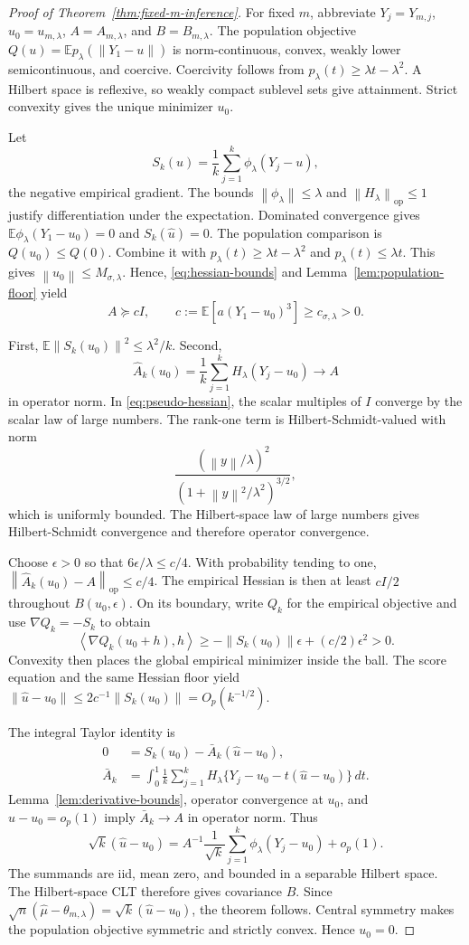 \documentclass[twoside]{article}
\theoremstyle{definition}
\newcommand{\E}{\mathbb E}
\newcommand{\norm}[1]{\left\lVert #1\right\rVert}
\newcommand{\ip}[2]{\left\langle #1,#2\right\rangle}
\newcommand{\op}{\mathrm{op}}
\begin{document}
\begin{proof}[Proof of Theorem~\ref{thm:fixed-m-inference}]
For fixed $m$, abbreviate $Y_j=Y_{m,j}$, $u_0=u_{m,\lambda}$, $A=A_{m,\lambda}$, and $B=B_{m,\lambda}$. The population objective $Q(u)=\E p_\lambda(\norm{Y_1-u})$ is norm-continuous, convex, weakly lower semicontinuous, and coercive. Coercivity follows from $p_\lambda(t)\ge\lambda t-\lambda^2$. A Hilbert space is reflexive, so weakly compact sublevel sets give attainment. Strict convexity gives the unique minimizer $u_0$.

Let
\[
    S_k(u)=\frac1k\sum_{j=1}^k\phi_\lambda(Y_j-u),
\]
the negative empirical gradient. The bounds $\norm{\phi_\lambda}\le\lambda$ and $\norm{H_\lambda}_{\op}\le1$ justify differentiation under the expectation. Dominated convergence gives $\E\phi_\lambda(Y_1-u_0)=0$ and $S_k(\hat u)=0$. The population comparison is $Q(u_0)\le Q(0)$. Combine it with $p_\lambda(t)\ge\lambda t-\lambda^2$ and $p_\lambda(t)\le\lambda t$. This gives $\norm{u_0}\le M_{\sigma,\lambda}$. Hence, \eqref{eq:hessian-bounds} and Lemma~\ref{lem:population-floor} yield
\[
    A\succeq cI,
    \qquad
    c:=\E[a(Y_1-u_0)^3]\ge c_{\sigma,\lambda}>0.
\]

First, $\E\norm{S_k(u_0)}^2\le\lambda^2/k$. Second,
\[
    \hat A_k(u_0)=\frac1k\sum_{j=1}^kH_\lambda(Y_j-u_0)\longrightarrow A
\]
in operator norm. In \eqref{eq:pseudo-hessian}, the scalar multiples of $I$ converge by the scalar law of large numbers. The rank-one term is Hilbert-Schmidt-valued with norm
\[
    \frac{(\norm y/\lambda)^2}{(1+\norm y^2/\lambda^2)^{3/2}},
\]
which is uniformly bounded. The Hilbert-space law of large numbers gives Hilbert-Schmidt convergence and therefore operator convergence.

Choose $\epsilon>0$ so that $6\epsilon/\lambda\le c/4$. With probability tending to one, $\norm{\hat A_k(u_0)-A}_{\op}\le c/4$. The empirical Hessian is then at least $cI/2$ throughout $B(u_0,\epsilon)$. On its boundary, write $Q_k$ for the empirical objective and use $\nabla Q_k=-S_k$ to obtain
\[
    \ip{\nabla Q_k(u_0+h)}{h}
    \ge-\norm{S_k(u_0)}\epsilon+(c/2)\epsilon^2>0.
\]
Convexity then places the global empirical minimizer inside the ball. The score equation and the same Hessian floor yield
$\norm{\hat u-u_0}\le2c^{-1}\norm{S_k(u_0)}=O_p(k^{-1/2})$.

The integral Taylor identity is
\begin{align*}
    0&=S_k(u_0)-\bar A_k(\hat u-u_0),\\
    \bar A_k
    &=\int_0^1\frac1k\sum_{j=1}^k
      H_\lambda\{Y_j-u_0-t(\hat u-u_0)\}\,dt.
\end{align*}
Lemma~\ref{lem:derivative-bounds}, operator convergence at $u_0$, and $\hat u-u_0=o_p(1)$ imply $\bar A_k\to A$ in operator norm. Thus
\[
    \sqrt k(\hat u-u_0)
    =A^{-1}\frac1{\sqrt k}\sum_{j=1}^k
      \phi_\lambda(Y_j-u_0)+o_p(1).
\]
The summands are iid, mean zero, and bounded in a separable Hilbert space. The Hilbert-space CLT therefore gives covariance $B$. Since $\sqrt n(\hat\mu-\theta_{m,\lambda})=\sqrt k(\hat u-u_0)$, the theorem follows. Central symmetry makes the population objective symmetric and strictly convex. Hence $u_0=0$.
\end{proof}
\end{document}

